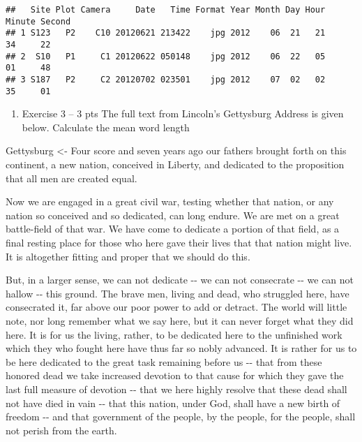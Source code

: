 \documentclass[
]{article}
\newenvironment{Shaded}{\begin{snugshade}}{\end{snugshade}}
\newcommand{\NormalTok}[1]{#1}
\newcommand{\OtherTok}[1]{\textcolor[rgb]{0.56,0.35,0.01}{#1}}
\newcommand{\StringTok}[1]{\textcolor[rgb]{0.31,0.60,0.02}{#1}}
\providecommand{\tightlist}{%
  \setlength{\itemsep}{0pt}\setlength{\parskip}{0pt}}
\begin{document}
\begin{verbatim}
##   Site Plot Camera     Date   Time Format Year Month Day Hour Minute Second
## 1 S123   P2    C10 20120621 213422    jpg 2012    06  21   21     34     22
## 2  S10   P1     C1 20120622 050148    jpg 2012    06  22   05     01     48
## 3 S187   P2     C2 20120702 023501    jpg 2012    07  02   02     35     01
\end{verbatim}

\begin{enumerate}
\def\labelenumi{(\arabic{enumi})}
\setcounter{enumi}{2}
\tightlist
\item
  Exercise 3 -- 3 pts The full text from Lincoln's Gettysburg Address is
  given below. Calculate the mean word length
\end{enumerate}

\begin{Shaded}
\begin{Highlighting}[]
\NormalTok{Gettysburg }\OtherTok{\textless{}{-}} \StringTok{\textquotesingle{}Four score and seven years ago our fathers brought forth on this }
\StringTok{continent, a new nation, conceived in Liberty, and dedicated to the proposition }
\StringTok{that all men are created equal.}

\StringTok{Now we are engaged in a great civil war, testing whether that nation, or any }
\StringTok{nation so conceived and so dedicated, can long endure. We are met on a great }
\StringTok{battle{-}field of that war. We have come to dedicate a portion of that field, as }
\StringTok{a final resting place for those who here gave their lives that that nation might }
\StringTok{live. It is altogether fitting and proper that we should do this.}

\StringTok{But, in a larger sense, we can not dedicate {-}{-} we can not consecrate {-}{-} we can }
\StringTok{not hallow {-}{-} this ground. The brave men, living and dead, who struggled here, }
\StringTok{have consecrated it, far above our poor power to add or detract. The world will }
\StringTok{little note, nor long remember what we say here, but it can never forget what }
\StringTok{they did here. It is for us the living, rather, to be dedicated here to the }
\StringTok{unfinished work which they who fought here have thus far so nobly advanced. It }
\StringTok{is rather for us to be here dedicated to the great task remaining before us {-}{-} }
\StringTok{that from these honored dead we take increased devotion to that cause for which }
\StringTok{they gave the last full measure of devotion {-}{-} that we here highly resolve that }
\StringTok{these dead shall not have died in vain {-}{-} that this nation, under God, shall }
\StringTok{have a new birth of freedom {-}{-} and that government of the people, by the people, }
\StringTok{for the people, shall not perish from the earth.\textquotesingle{}}
\end{Highlighting}
\end{Shaded}
\end{document}
